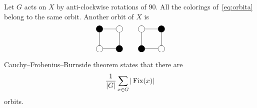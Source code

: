 \begin{example}
Let $G$ acts on $X$ by anti-clockwise rotations  
of 90\textdegree. All the colorings of~\eqref{eq:orbita} belong to the same orbit. 
Another orbit of $X$ is
\[
\begin{tikzpicture}
    \node[shape=circle,draw=black,fill=black] (A) at (1,0) {};
    \node[shape=circle,draw=black] (B) at (1,1) {};
    \node[shape=circle,draw=black,fill=black] (C) at (0,1) {};
    \node[shape=circle,draw=black] (D) at (0,0) {};
    \path [-](A) edge node[left]{} (B);
    \path [-](B) edge node[left]{} (C);
    \path [-](C) edge node[left]{} (D);
    \path [-](D) edge node[left]{} (A);
\end{tikzpicture}
\qquad
\begin{tikzpicture}
    \node[shape=circle,draw=black] (A) at (1,0) {};
    \node[shape=circle,draw=black,fill=black] (B) at (1,1) {};
    \node[shape=circle,draw=black] (C) at (0,1) {};
    \node[shape=circle,draw=black,fill=black] (D) at (0,0) {};
    \path [-](A) edge node[left]{} (B);
    \path [-](B) edge node[left]{} (C);
    \path [-](C) edge node[left]{} (D);
    \path [-](D) edge node[left]{} (A);
\end{tikzpicture}
\]

Cauchy--Frobenius--Burnside theorem states that
there are  
\[
\frac{1}{|G|}\sum_{x\in G}|\operatorname{Fix}(x)|
\]
orbits. 


\end{example}

